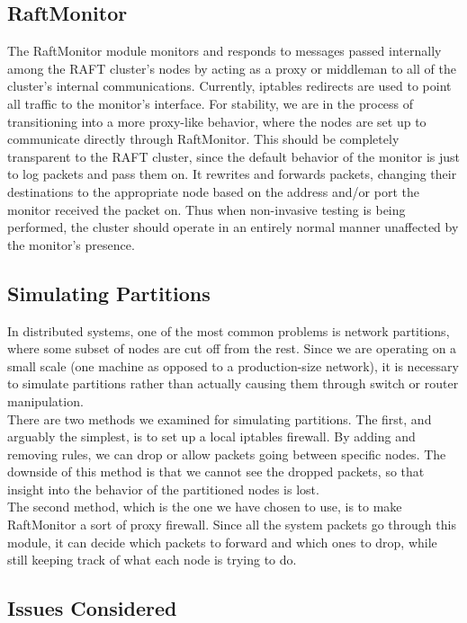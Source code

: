 \documentclass[UTF8]{article}
\begin{document}
\subsection{RaftMonitor}

The RaftMonitor module monitors and responds to messages passed internally among the RAFT cluster's nodes by acting as a proxy or middleman to all of the cluster's internal communications. Currently, iptables redirects are used to point all traffic to the monitor's interface. For stability, we are in the process of transitioning into a more proxy-like behavior, where the nodes are set up to communicate directly through RaftMonitor. This should be completely transparent to the RAFT cluster, since the default behavior of the monitor is just to log packets and pass them on. It rewrites and forwards packets, changing their destinations to the appropriate node based on the address and/or port the monitor received the packet on. Thus when non-invasive testing is being performed, the cluster should operate in an entirely normal manner unaffected by the monitor's presence.

\subsection{Simulating Partitions}

In distributed systems, one of the most common problems is network partitions, where some subset of nodes are cut off from the rest. Since we are operating on a small scale (one machine as opposed to a production-size network), it is necessary to simulate partitions rather than actually causing them through switch or router manipulation.
\\ \indent There are two methods we examined for simulating partitions. The first, and arguably the simplest, is to set up a local iptables firewall. By adding and removing rules, we can drop or allow packets going between specific nodes. The downside of this method is that we cannot see the dropped packets, so that insight into the behavior of the partitioned nodes is lost.
\\ \indent The second method, which is the one we have chosen to use, is to make RaftMonitor a sort of proxy firewall. Since all the system packets go through this module, it can decide which packets to forward and which ones to drop, while still keeping track of what each node is trying to do.

\subsection{Issues Considered}
\end{document}

